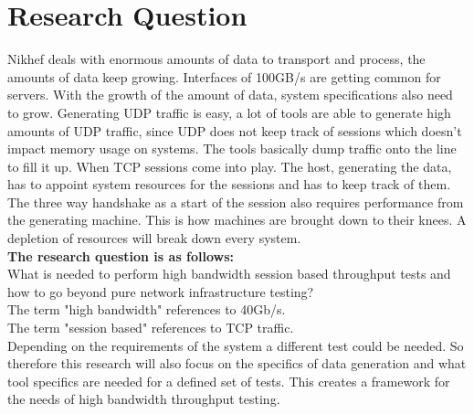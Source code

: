 \section{Research Question}

Nikhef deals with enormous amounts of data to transport and process, the amounts of data keep growing.  
Interfaces of 100GB/s are getting common for servers.
With the growth of the amount of data, system specifications also need to grow.
Generating UDP traffic is easy, a lot of tools are able to generate high amounts of UDP traffic, since UDP does not keep track of sessions which doesn't impact memory usage on systems. The tools basically dump traffic onto the line to fill it up. When TCP sessions come into play.
The host, generating the data, has to appoint system resources for the sessions and has to keep track of them. The three way handshake as a start of the session also requires performance from the generating machine. This is how machines are brought down to their knees. A depletion of resources will break down every system. \\
  
\textbf{The research question is as follows:}\\
What is needed to perform high bandwidth session based throughput tests and how to go beyond pure network infrastructure testing? \\

The term "high bandwidth" references to 40Gb/s. \\
The term "session based" references to TCP traffic. \\

Depending on the requirements of the system a different test could be needed. 
So therefore this research will also focus on the specifics of data generation and what tool specifics are needed for a defined set of tests. This creates a framework for the needs of high bandwidth throughput testing.  

